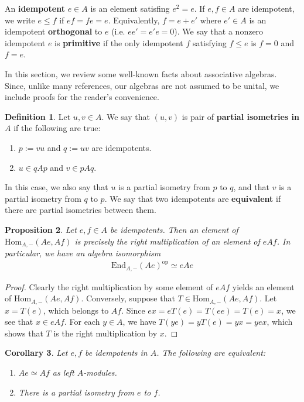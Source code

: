 \documentclass[11pt,b5paper,notitlepage]{article}
\theoremstyle{definition}
\newtheorem{df}{Definition}[section]
\theoremstyle{plain}
\newtheorem{pp}[df]{Proposition}
\newtheorem{co}[df]{Corollary}
\newcommand{\End}{\mathrm{End}} %
\newcommand{\Hom}{\mathrm{Hom}}
\newcommand{\opp}{\mathrm{op}}
\numberwithin{equation}{section}
\begin{document}
An \textbf{idempotent} $e\in A$ is an element satisfing $e^2=e$. If $e,f\in A$ are idempotent, we write $e\leq f$ if $ef=fe=e$. Equivalently, $f=e+e'$ where $e'\in A$ is an idempotent \textbf{orthogonal} to $e$ (i.e. $ee'=e'e=0$). We say that a nonzero idempotent $e$ is \textbf{primitive} if the only idempotent $f$ satisfying $f\leq e$ is $f=0$ and $f=e$.


In this section, we review some well-known facts about associative algebras. Since, unlike many references, our algebras are not assumed to be unital, we include proofs for the reader's convenience.

\begin{df}
Let $u,v\in A$. We say that $(u,v)$ is pair of \textbf{partial isometries in $A$} if the following are true:
\begin{enumerate}[label=(\alph*)]
\item $p:=vu$ and $q:=uv$ are idempotents.
\item $u\in qAp$ and $v\in pAq$.
\end{enumerate}
In this case, we also say that $u$ is a partial isometry from $p$ to $q$, and that $v$ is a partial isometry from $q$ to $p$. We say that two idempotents are \textbf{equivalent} if there are partial isometries between them.
\end{df}


\begin{pp}\label{lb6}
Let $e,f\in A$ be idempotents. Then an element of $\Hom_{A,-}(Ae,Af)$ is precisely the right multiplication of an element of $eAf$. In particular, we have an algebra isomorphism
\begin{align*}
\End_{A,-}(Ae)^\opp\simeq eAe
\end{align*}
\end{pp}


\begin{proof}
Clearly the right multiplication by some element of $eAf$ yields an element of $\Hom_{A,-}(Ae,Af)$. Conversely, suppose that $T\in \Hom_{A,-}(Ae,Af)$. Let $x=T(e)$, which belongs to $Af$. Since $ex=eT(e)=T(ee)=T(e)=x$, we see that $x\in eAf$. For each $y\in A$, we have $T(ye)=yT(e)=yx=yex$, which shows that $T$ is the right multiplication by $x$.
\end{proof}



\begin{co}\label{lb13}
Let $e,f$ be idempotents in $A$. The following are equivalent: 
\begin{enumerate}[label=(\arabic*)]
\item $Ae\simeq Af$ as left $A$-modules.
\item There is a partial isometry from $e$ to $f$.
\end{enumerate}
\end{co}
\end{document}
